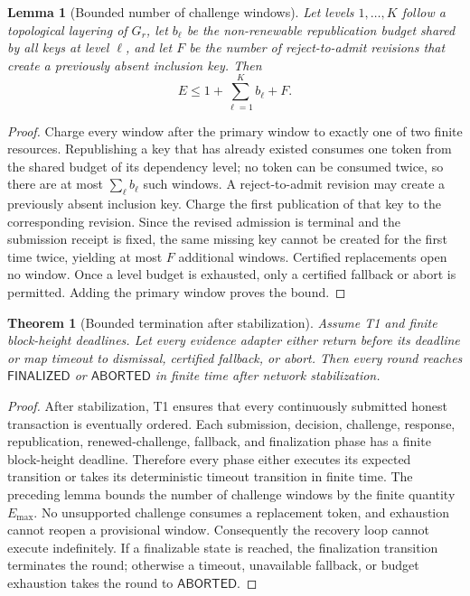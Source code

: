 \documentclass[10pt]{article}
\newtheorem{theorem}{Theorem}
\newtheorem{lemma}{Lemma}
\newcommand{\FINAL}{\mathsf{FINALIZED}}
\newcommand{\ABORT}{\mathsf{ABORTED}}
\begin{document}
\begin{lemma}[Bounded number of challenge windows]
Let levels $1,\ldots,K$ follow a topological layering of $G_r$, let $b_\ell$ be
the non-renewable republication budget shared by all keys at level $\ell$, and
let $F$ be the number of reject-to-admit revisions that create a previously
absent inclusion key.  Then
\[
  E\le 1+\sum_{\ell=1}^{K}b_\ell+F.
\]
\end{lemma}
\begin{proof}
Charge every window after the primary window to exactly one of two finite
resources.  Republishing a key that has already existed consumes one token from
the shared budget of its dependency level; no token can be consumed twice, so
there are at most $\sum_\ell b_\ell$ such windows.  A reject-to-admit revision
may create a previously absent inclusion key.  Charge the first publication of
that key to the corresponding revision.  Since the revised admission is
terminal and the submission receipt is fixed, the same missing key cannot be
created for the first time twice, yielding at most $F$ additional windows.
Certified replacements open no window.  Once a level budget is exhausted, only
a certified fallback or abort is permitted.  Adding the primary window proves
the bound.
\end{proof}

\begin{theorem}[Bounded termination after stabilization]
Assume T1 and finite block-height deadlines.  Let every evidence adapter either
return before its deadline or map timeout to dismissal, certified fallback, or
abort.  Then every round reaches $\FINAL$ or $\ABORT$ in finite time after
network stabilization.
\end{theorem}
\begin{proof}
After stabilization, T1 ensures that every continuously submitted honest
transaction is eventually ordered.  Each submission, decision, challenge,
response, republication, renewed-challenge, fallback, and finalization phase has
a finite block-height deadline.  Therefore every phase either executes its
expected transition or takes its deterministic timeout transition in finite
time.  The preceding lemma bounds the number of challenge windows by the finite
quantity $E_{\max}$.  No unsupported challenge consumes a replacement token,
and exhaustion cannot reopen a provisional window.  Consequently the recovery
loop cannot execute indefinitely.  If a finalizable state is reached, the
finalization transition terminates the round; otherwise a timeout, unavailable
fallback, or budget exhaustion takes the round to $\ABORT$.
\end{proof}
\end{document}
